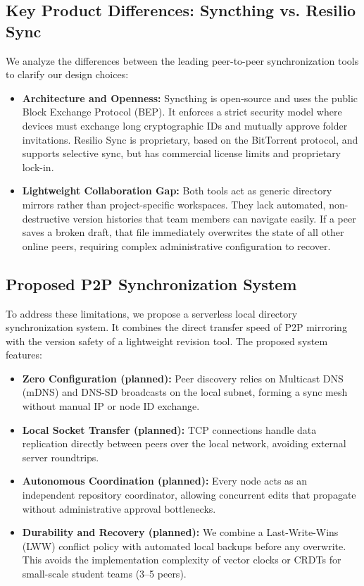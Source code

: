 \documentclass[11pt,oneside]{article}
\begin{document}
\subsection{Key Product Differences: Syncthing vs. Resilio Sync}
We analyze the differences between the leading peer-to-peer synchronization tools to clarify our design choices:
\begin{itemize}
    \item \textbf{Architecture and Openness:} Syncthing is open-source and uses the public Block Exchange Protocol (BEP). It enforces a strict security model where devices must exchange long cryptographic IDs and mutually approve folder invitations. Resilio Sync is proprietary, based on the BitTorrent protocol, and supports selective sync, but has commercial license limits and proprietary lock-in.
    \item \textbf{Lightweight Collaboration Gap:} Both tools act as generic directory mirrors rather than project-specific workspaces. They lack automated, non-destructive version histories that team members can navigate easily. If a peer saves a broken draft, that file immediately overwrites the state of all other online peers, requiring complex administrative configuration to recover.
\end{itemize}

\subsection{Proposed P2P Synchronization System}
To address these limitations, we propose a serverless local directory synchronization system. It combines the direct transfer speed of P2P mirroring with the version safety of a lightweight revision tool. The proposed system features:
\begin{itemize}
    \item \textbf{Zero Configuration (planned):} Peer discovery relies on Multicast DNS (mDNS) \cite{rfc6762} and DNS-SD \cite{rfc6763} broadcasts on the local subnet, forming a sync mesh without manual IP or node ID exchange.
    \item \textbf{Local Socket Transfer (planned):} TCP connections \cite{rfc9293} handle data replication directly between peers over the local network, avoiding external server roundtrips.
    \item \textbf{Autonomous Coordination (planned):} Every node acts as an independent repository coordinator, allowing concurrent edits that propagate without administrative approval bottlenecks.
    \item \textbf{Durability and Recovery (planned):} We combine a Last-Write-Wins (LWW) conflict policy with automated local backups before any overwrite. This avoids the implementation complexity of vector clocks or CRDTs for small-scale student teams (3–5 peers).
\end{itemize}
\end{document}
